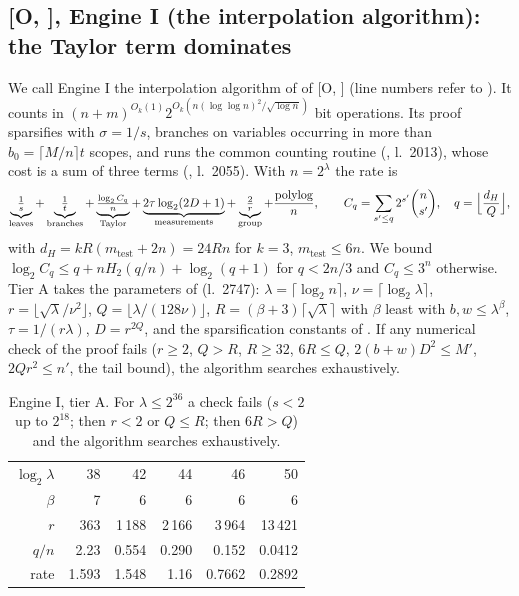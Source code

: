 \documentclass[10pt]{amsart}
\theoremstyle{definition}
\theoremstyle{remark}
\numberwithin{equation}{section}
\newcommand{\Oa}[1][]{\textup{[O\if\relax\detokenize{#1}\relax\else, #1\fi]}}
\begin{document}
\subsection{\texorpdfstring{\Oa}{[O]}, Engine I (the interpolation algorithm): the Taylor term dominates}\label{sec:engineI}
We call Engine I the interpolation algorithm of  of \Oa{} (line
numbers refer to ). It counts in
$(n+m)^{O_k(1)}2^{O_k(n(\log\log n)^2/\sqrt{\log n})}$ bit operations. Its proof sparsifies with
$\sigma=1/s$, branches on variables occurring in more than $b_0=\lceil M/n\rceil t$ scopes, and runs
the common counting routine (, l.~2013), whose cost is a sum of three terms
(, l.~2055). With $n=2^\lambda$ the rate is
\[
\underbrace{\tfrac1s}_{\text{leaves}}+\underbrace{\tfrac1t}_{\text{branches}}
+\underbrace{\tfrac{\log_2C_q}{n}}_{\text{Taylor}}+\underbrace{2\tau\log_2(2D+1)}_{\text{measurements}}
+\underbrace{\tfrac2r}_{\text{group}}+\frac{\mathrm{polylog}}{n},
\qquad C_q=\sum_{s'\le q}2^{s'}\binom n{s'},\quad q=\Bigl\lfloor\frac{d_H}{Q}\Bigr\rfloor,
\]
with $d_H=kR(m_{\mathrm{test}}+2n)=24Rn$ for $k=3$, $m_{\mathrm{test}}\le6n$. We bound
$\log_2C_q\le q+nH_2(q/n)+\log_2(q+1)$ for $q<2n/3$ and $C_q\le3^n$ otherwise. Tier A takes the
parameters of  (l.~2747): $\lambda=\lceil\log_2n\rceil$,
$\nu=\lceil\log_2\lambda\rceil$, $r=\lfloor\sqrt\lambda/\nu^2\rfloor$,
$Q=\lfloor\lambda/(128\nu)\rfloor$, $R=(\beta+3)\lceil\sqrt\lambda\rceil$ with $\beta$ least with
$b,w\le\lambda^\beta$, $\tau=1/(r\lambda)$, $D=r^{2Q}$, and the sparsification constants of
. If any numerical check of the proof fails ($r\ge2$, $Q>R$, $R\ge32$, $6R\le Q$,
$2(b+w)D^2\le M'$, $2Qr^2\le n'$, the tail bound), the algorithm searches exhaustively.

\begin{table}[ht]
\centering\small
\caption{Engine I, tier A. For $\lambda\le2^{36}$ a check fails ($s<2$ up to $2^{18}$; then $r<2$ or
$Q\le R$; then $6R>Q$) and the algorithm searches exhaustively.}\label{tab:oaiA}
\begin{tabular}{@{}rrrrrr@{}}
\toprule
$\log_2\lambda$ & 38 & 42 & 44 & 46 & 50\\
$\beta$ & 7 & 6 & 6 & 6 & 6\\
$r$ & 363 & 1\,188 & 2\,166 & 3\,964 & 13\,421\\
$q/n$ & 2.23 & 0.554 & 0.290 & 0.152 & 0.0412\\
rate & 1.593 & 1.548 & 1.16 & 0.7662 & 0.2892\\
\bottomrule
\end{tabular}
\end{table}
\end{document}
